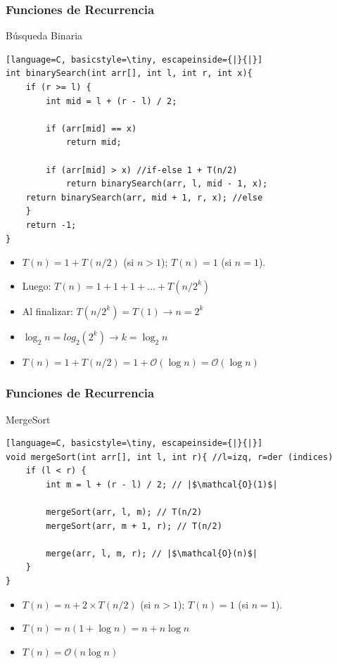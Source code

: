 \documentclass{beamer}
\begin{document}
\begin{frame}[fragile]
 \frametitle{Funciones de Recurrencia}
\small
\begin{exampleblock}{Búsqueda Binaria}
\begin{lstlisting}[language=C, basicstyle=\tiny, escapeinside={|}{|}]
int binarySearch(int arr[], int l, int r, int x){
    if (r >= l) {
        int mid = l + (r - l) / 2;

        if (arr[mid] == x) 
            return mid;

        if (arr[mid] > x) //if-else 1 + T(n/2)
            return binarySearch(arr, l, mid - 1, x);
	return binarySearch(arr, mid + 1, r, x); //else
    }
    return -1;
}
\end{lstlisting}
\end{exampleblock}

\begin{itemize}
\item $T(n) = 1+ T(n/2) $ (si $n > 1$); $T(n) = 1$ (si $n = 1$).
\item Luego: $T(n) = 1 + 1 + 1 + \dots + T(n/2^k)$ \pause
\item Al finalizar: $T(n/2^k) = T(1) \rightarrow n = 2^k$ \pause
\item $\log_2 n  = log_2(2^k) \rightarrow k = \log_2 n $ \pause 
\item $ T(n) = 1 + T(n/2) = 1 + \mathcal{O}(\log n) = \mathcal{O}(\log n)$
\end{itemize}
\end{frame}


\begin{frame}[fragile]
 \frametitle{Funciones de Recurrencia}
\small
\begin{exampleblock}{MergeSort}
\begin{lstlisting}[language=C, basicstyle=\tiny, escapeinside={|}{|}]
void mergeSort(int arr[], int l, int r){ //l=izq, r=der (indices)
    if (l < r) {
        int m = l + (r - l) / 2; // |$\mathcal{O}(1)$|

        mergeSort(arr, l, m); // T(n/2)
        mergeSort(arr, m + 1, r); // T(n/2)

        merge(arr, l, m, r); // |$\mathcal{O}(n)$| 
    }
}
\end{lstlisting}
\end{exampleblock}


\begin{itemize}
\item $T(n) = n + 2 \times T(n/2) $ (si $n > 1$); $T(n) = 1$ (si $n = 1$).
\item $T(n) = n (1 + \log n) = n + n \log n$
\item $T(n) = \mathcal{O}(n \log n) $
\end{itemize}
\end{frame}
\end{document}
